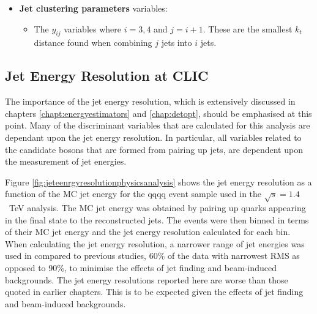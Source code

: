 \begin{itemize}
\item \textbf{Jet clustering parameters} variables:
\begin{itemize}
\item The $y_{ij}$ variables where $i = 3,4$ and $j=i+1$.  These are the smallest $k_{t}$ distance found when combining $j$ jets into $i$ jets.  
\end{itemize}
\end{itemize}


\subsection{Jet Energy Resolution at CLIC} 
\label{sec:jetenergyresolution}
The importance of the jet energy resolution, which is extensively discussed in chapters \ref{chapt:energyestimators} and \ref{chap:detopt}, should be emphasised at this point.  Many of the discriminant variables that are calculated for this analysis are dependant upon the jet energy resolution.  In particular, all variables related to the candidate bosons that are formed from pairing up jets, are dependent upon the measurement of jet energies.  

Figure \ref{fig:jeteenrgyresolutionphysicsanalysis} shows the jet energy resolution as a function of the MC jet energy for the {\nu}{\nu}qqqq event sample used in the $\sqrt{s}=1.4$~TeV analysis.  The MC jet energy was obtained by pairing up quarks appearing in the final state to the reconstructed jets.  The events were then binned in terms of their MC jet energy and the jet energy resolution calculated for each bin.  When calculating the jet energy resolution, a narrower range of jet energies was used in compared to previous studies, 60\% of the data with narrowest RMS as opposed to 90\%, to minimise the effects of jet finding and beam-induced backgrounds.  The jet energy resolutions reported here are worse than those quoted in earlier chapters.  This is to be expected given the effects of jet finding and beam-induced backgrounds.

